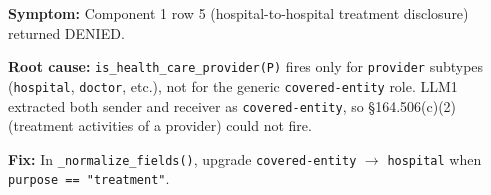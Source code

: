 \documentclass[11pt,letterpaper]{article}
\begin{document}
\begin{appendices}
\textbf{Symptom:} Component 1 row 5 (hospital-to-hospital treatment disclosure) returned DENIED.

\textbf{Root cause:} \texttt{is\_health\_care\_provider(P)} fires only for \texttt{provider} subtypes (\texttt{hospital}, \texttt{doctor}, etc.), not for the generic \texttt{covered-entity} role. LLM1 extracted both sender and receiver as \texttt{covered-entity}, so \S 164.506(c)(2) (treatment activities of a provider) could not fire.

\textbf{Fix:} In \texttt{\_normalize\_fields()}, upgrade \texttt{covered-entity} $\to$ \texttt{hospital} when \texttt{purpose == "treatment"}.

\end{appendices}
\end{document}
